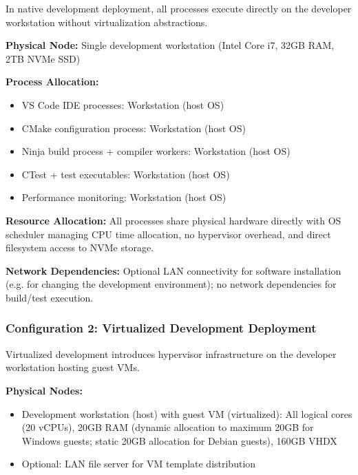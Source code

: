 In native development deployment, all processes execute directly on the developer workstation without virtualization abstractions.

\textbf{Physical Node:} Single development workstation (Intel Core i7, 32GB RAM, 2TB NVMe SSD)

\textbf{Process Allocation:}
\begin{itemize}
\item VS Code IDE processes: Workstation (host OS)
\item CMake configuration process: Workstation (host OS)
\item Ninja build process + compiler workers: Workstation (host OS)
\item CTest + test executables: Workstation (host OS)
\item Performance monitoring: Workstation (host OS)
\end{itemize}

\textbf{Resource Allocation:} All processes share physical hardware directly with OS scheduler managing CPU time allocation, no hypervisor overhead, and direct filesystem access to NVMe storage.

\textbf{Network Dependencies:} Optional LAN connectivity for software installation (e.g. for changing the development environment); no network dependencies for build/test execution.

\subsubsection{Configuration 2: Virtualized Development Deployment}

Virtualized development introduces hypervisor infrastructure on the developer workstation hosting guest VMs.

\textbf{Physical Nodes:}
\begin{itemize}
\item Development workstation (host) with guest VM (virtualized): All logical cores (20 vCPUs), 20GB RAM (dynamic allocation to maximum 20GB for Windows guests; static 20GB allocation for Debian guests), 160GB VHDX
\item Optional: LAN file server for VM template distribution
\end{itemize}

